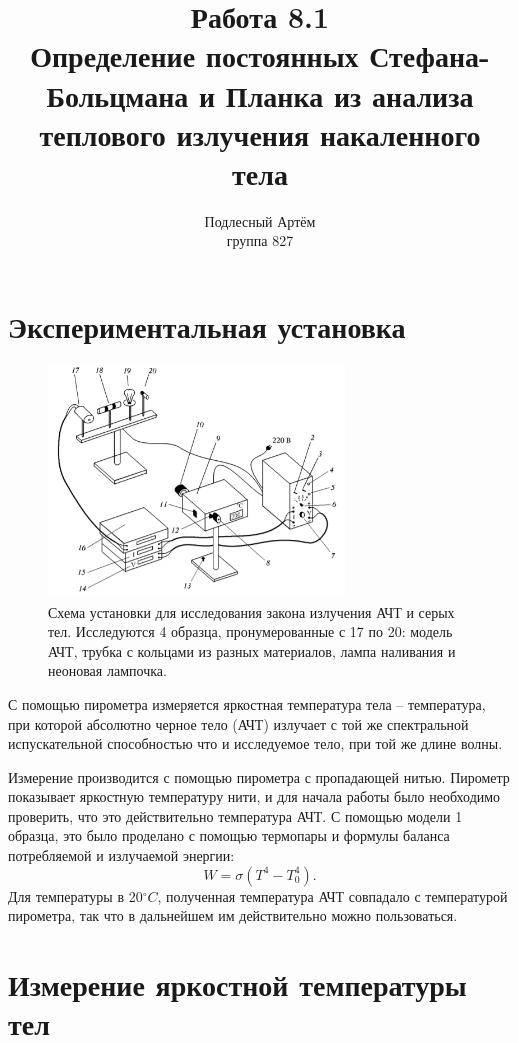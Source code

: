 \documentclass[a4paper, 14pt]{extarticle}%
\author{Подлесный Артём \\ группа 827}
\title{Работа 8.1 \\ Определение постоянных Стефана-Больцмана и Планка из анализа теплового излучения накаленного тела}
\newcommand\ECaption[1]{%
     \captionsetup{font=footnotesize}%
     \caption{#1}}
\begin{document}
\maketitle

\section*{Экспериментальная установка}

\begin{figure}[h]
\begin{center}
\includegraphics[width=0.7\textwidth]{ust}
\end{center}
\ECaption{Схема установки для исследования закона излучения АЧТ и серых тел. Исследуются 4 образца, пронумерованные с 17 по 20: модель АЧТ, трубка с кольцами из разных материалов, лампа наливания и неоновая лампочка.  }
\end{figure}

С помощью пирометра измеряется яркостная температура тела -- температура, при которой абсолютно черное тело (АЧТ) излучает с той же спектральной испускательной способностью что и исследуемое тело, при той же длине волны. 

Измерение производится с помощью пирометра с пропадающей нитью. Пирометр показывает яркостную температуру нити, и для начала работы было необходимо проверить, что это действительно температура АЧТ. С помощью модели 1 образца, это было проделано с помощью термопары и формулы баланса потребляемой и излучаемой энергии:
\[W = \sigma (T^4-T_0^4).\]
Для температуры в 20$^{\circ} C$, полученная температура АЧТ совпадало с температурой пирометра, так что в дальнейшем им действительно можно пользоваться.

\section*{Измерение яркостной температуры тел}
\end{document}
